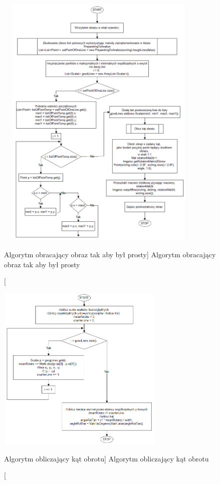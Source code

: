 \documentclass[a4paper,12pt]{article}
\begin{document}
        		 \begin{figure}[!ht]  
                    \begin{center}
        	    	    \includegraphics[height=12.5cm, width=10cm]{image//algorithm//toStraightenUp.png} 
    			    \end{center}
        		    \caption
            			[Algorytm obracający obraz tak aby był prosty]  
            			{Algorytm obracający obraz tak aby był prosty}  
        	    \end{figure}
        		 
    		    \begin{figure}[!ht]  
                    \begin{center}
        	    	    \includegraphics[height=8cm, width=8cm]{image//algorithm//toStraightenUpPred.png} 
    			    \end{center}
        		    \caption
        			    [Algorytm obliczający kąt obrotu]  
        			    {Algorytm obliczający kąt obrotu}  
        	    \end{figure}
		 
\end{document}
